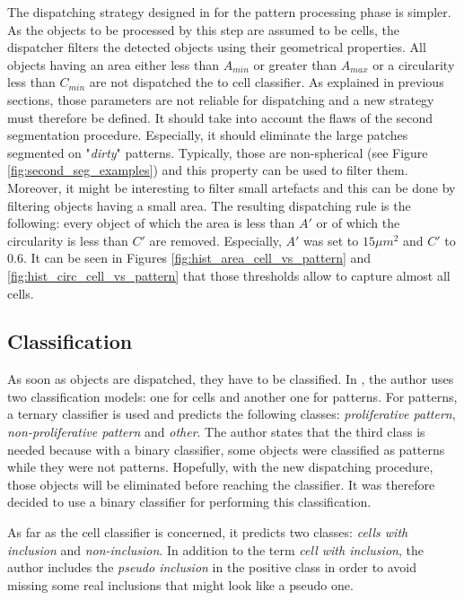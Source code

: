 The dispatching strategy designed in \cite{adeblire2013} for the pattern processing phase is simpler. As the objects to be processed by this step are assumed to be cells, the dispatcher filters the detected objects using their geometrical properties. All objects having an area either less than $A_{min}$ or greater than $A_{max}$ or a circularity less than $C_{min}$ are not dispatched the to cell classifier. As explained in previous sections, those parameters are not reliable for dispatching and a new strategy must therefore be defined. It should take into account the flaws of the second segmentation procedure. Especially, it should eliminate the large patches segmented on "\textit{dirty}" patterns. Typically, those are non-spherical (see Figure \ref{fig:second_seg_examples}) and this property can be used to filter them. Moreover, it might be interesting to filter small artefacts and this can be done by filtering objects having a small area. The resulting dispatching rule is the following: every object of which the area is less than $A'$ or of which the circularity is less than $C'$ are removed. Especially, $A'$ was set to $15 \mu m^2$ and $C'$ to $0.6$. It can be seen in Figures \ref{fig:hist_area_cell_vs_pattern} and \ref{fig:hist_circ_cell_vs_pattern} that those thresholds allow to capture almost all cells. 

\subsection{Classification}

As soon as objects are dispatched, they have to be classified. In \cite{adeblire2013}, the author uses two classification models: one for cells and another one for patterns. For patterns, a ternary classifier is used and predicts the following classes: \textit{proliferative pattern}, \textit{non-proliferative pattern} and \textit{other}. The author states that the third class is needed because with a binary classifier, some objects were classified as patterns while they were not patterns. Hopefully, with the new dispatching procedure, those objects will be eliminated before reaching the classifier. It was therefore decided to use a binary classifier for performing this classification. 

As far as the cell classifier is concerned, it predicts two classes: \textit{cells with inclusion} and \textit{non-inclusion}. In addition to the term \textit{cell with inclusion}, the author includes the \textit{pseudo inclusion} in the positive class in order to avoid missing some real inclusions that might look like a pseudo one. 

